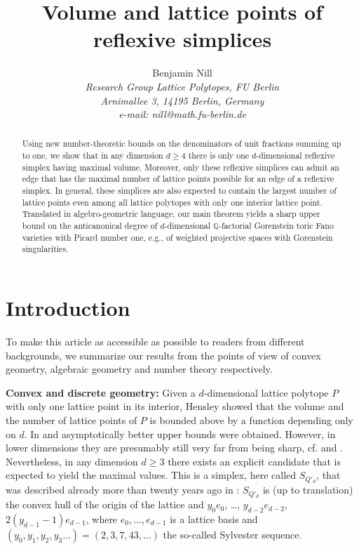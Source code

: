 \documentclass[a4paper,twoside]{article}
\title{Volume and lattice points of reflexive simplices}
\author{\vspace*{-1ex}\sc \normalsize{Benjamin Nill} \\[2ex]
\small  \em Research Group Lattice Polytopes, FU Berlin\\[-.5ex]
\small \em Arnimallee 3, 14195 Berlin, Germany  \\[-.5ex]
\small \em e-mail: nill@math.fu-berlin.de \\[-.5ex]
 }
\def\Q{{\mathbb Q}}
\begin{document}
\date{}

\maketitle
\vspace*{-5ex}

\begin{abstract}
Using new number-theoretic bounds on the denominators of unit fractions summing up to one, 
we show that in any dimension $d \geq 4$ there is only one $d$-dimensional reflexive simplex having maximal volume. 
Moreover, only these reflexive simplices can admit an edge that has the maximal number of lattice points possible for an edge 
of a reflexive simplex. 
In general, these simplices are also expected to contain the largest number of lattice points even among all lattice polytopes 
with only one interior lattice point. 
Translated in algebro-geometric language, our main theorem yields 
a sharp upper bound on the anticanonical degree of $d$-dimensional $\Q$-factorial Gorenstein toric Fano varieties with Picard number one, 
e.g., of weighted projective spaces with Gorenstein singularities.
\end{abstract}

\section*{Introduction}
\label{intro}

To make this article as accessible as possible to readers from different backgrounds, we summarize our results 
from the points of view of convex geometry, algebraic geometry and number theory respectively.

\smallskip

\textbf{Convex and discrete geometry:} 
Given 
a $d$-dimensional lattice polytope $P$ with only one lattice point in its interior, 
Hensley \cite{Hen83} showed that the volume and the number of lattice points of $P$ is bounded above by 
a function depending only on $d$. In \cite{LZ91} and \cite{Pik01} asymptotically better 
upper bounds were obtained. However, in lower dimensions they are presumably still very far from being sharp, 
cf. \cite{Kas06} and \cite{Rez06}. Nevertheless, 
in any dimension $d \geq 3$ there exists an explicit candidate that is expected to yield 
the maximal values. This is a simplex, here called $S_{Q'_d}$, 
that was described already more than twenty years ago in \cite{ZPW82}: $S_{Q'_d}$ is (up to translation) the convex hull of the origin 
of the lattice and $y_0 e_0$, \ldots, $y_{d-2} e_{d-2}$, $2(y_{d-1}-1) e_{d-1}$, where $e_0, \ldots, e_{d-1}$ is a lattice basis and 
$(y_0, y_1, y_2, y_3\ldots) = (2,3,7,43, \ldots)$ the so-called Sylvester sequence. 
\end{document}
